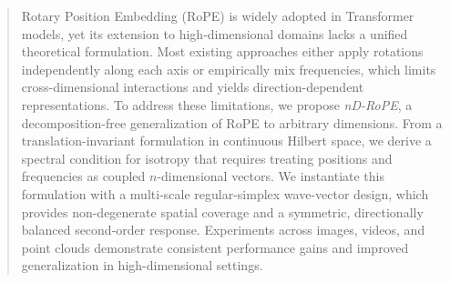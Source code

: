 \documentclass{article}
\theoremstyle{plain}
\theoremstyle{definition}
\theoremstyle{remark}
\begin{document}



\printAffiliationsAndNotice{}  %

\begin{abstract}
Rotary Position Embedding (RoPE) is widely adopted in Transformer models, yet its extension to high-dimensional domains lacks a unified theoretical formulation. Most existing approaches either apply rotations independently along each axis or empirically mix frequencies, which limits cross-dimensional interactions and yields direction-dependent representations. To address these limitations, we propose \textit{nD-RoPE}, a decomposition-free generalization of RoPE to arbitrary dimensions. From a translation-invariant formulation in continuous Hilbert space, we derive a spectral condition for isotropy that requires treating positions and frequencies as coupled $n$-dimensional vectors. We instantiate this formulation with a multi-scale regular-simplex wave-vector design, which provides non-degenerate spatial coverage and a symmetric, directionally balanced second-order response. Experiments across images, videos, and point clouds demonstrate consistent performance gains and improved generalization in high-dimensional settings.
\end{abstract}
\end{document}

